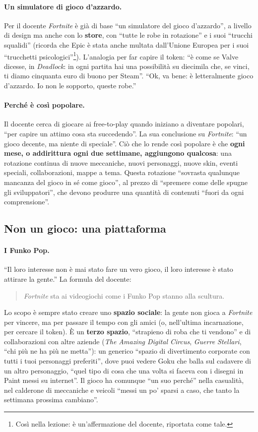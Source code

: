 \paragraph{Un simulatore di gioco d'azzardo.} Per il docente \emph{Fortnite} è già
di base ``un simulatore del gioco d'azzardo'', a livello di design ma anche con
lo \textbf{store}, con ``tutte le robe in rotazione'' e i suoi ``trucchi
squalidi'' (ricorda che Epic è stata anche multata dall'Unione Europea per i
suoi ``trucchetti psicologici''\footnote{Così nella lezione: è un'affermazione
del docente, riportata come tale.}). L'analogia per far capire il token: ``è come
se Valve dicesse, in \emph{Deadlock}: in ogni partita hai una possibilità su
diecimila che, se vinci, ti diamo cinquanta euro di buono per Steam''. ``Ok, va
bene: è letteralmente gioco d'azzardo. Io non le sopporto, queste robe.''

\paragraph{Perché è così popolare.} Il docente cerca di giocare ai free-to-play
quando iniziano a diventare popolari, ``per capire un attimo cosa sta
succedendo''. La sua conclusione su \emph{Fortnite}: ``un gioco decente, ma niente
di speciale''. Ciò che lo rende così popolare è che \textbf{ogni mese, o
addirittura ogni due settimane, aggiungono qualcosa}: una rotazione continua di
nuove meccaniche, nuovi personaggi, nuove skin, eventi speciali, collaborazioni,
mappe a tema. Questa rotazione ``sovrasta qualunque mancanza del gioco in sé come
gioco'', al prezzo di ``spremere come delle spugne gli sviluppatori'', che devono
produrre una quantità di contenuti ``fuori da ogni comprensione''.

\subsection{Non un gioco: una piattaforma}

\paragraph{I Funko Pop.} ``Il loro interesse non è mai stato fare un vero gioco,
il loro interesse è stato attirare la gente.'' La formula del docente:
\begin{quote}
\emph{Fortnite} sta ai videogiochi come i Funko Pop stanno alla scultura.
\end{quote}
Lo scopo è sempre stato creare uno \textbf{spazio sociale}: la gente non gioca a
\emph{Fortnite} per vincere, ma per passare il tempo con gli amici (o, nell'ultima
incarnazione, per cercare il token). È un \textbf{terzo spazio}, ``strapieno di
roba che ti vendono'' e di collaborazioni con altre aziende (\emph{The Amazing
Digital Circus}, \emph{Guerre Stellari}, ``chi più ne ha più ne metta''): un
generico ``spazio di divertimento corporate con tutti i tuoi personaggi
preferiti'', dove puoi vedere Goku che balla sul cadavere di un altro personaggio,
``quel tipo di cosa che una volta si faceva con i disegni in Paint messi su
internet''. Il gioco ha comunque ``un suo perché'' nella casualità, nel calderone
di meccaniche e veicoli ``messi un po' sparsi a caso, che tanto la settimana
prossima cambiano''.


